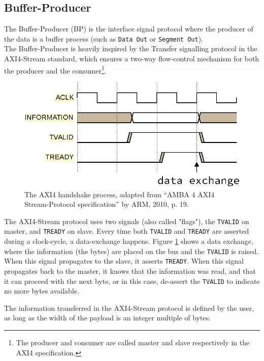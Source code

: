 \subsection{Buffer-Producer}
The Buffer-Producer (BP) is the interface signal protocol where the producer of
the data is a buffer process (such as \texttt{Data Out} or \texttt{Segment
Out}).\\
The Buffer-Producer is heavily inspired by the Transfer signalling protocol in
the AXI4-Stream standard, which ensures a two-way flow-control mechanism for both
the producer and the consumer\footnote{The producer and consumer are called
master and slave respectively in the AXI4 specification.}\cite{arm_axi4}.

\begin{figure}[h]
\centering
\includegraphics[scale=0.8]{implementation/axi4_handshake.eps}
\caption{The AXI4 handshake process, adapted from “AMBA 4 AXI4 Stream-Protocol
	specification” by ARM, 2010, p. 19.\cite{arm_axi4}}
\label{fig:axi4_handshake}
\end{figure}

The AXI4-Stream protocol uses two signals (also called "flags"), the \texttt{TVALID}
on master, and \texttt{TREADY} on slave. Every time both \texttt{TVALID} and
\texttt{TREADY} are asserted during a clock-cycle, a data-exchange happens.
Figure \ref{fig:axi4_handshake} shows a data exchange, where the information
(the bytes) are placed on the bus and the \texttt{TVALID} is raised. When this
signal propagates to the slave, it asserts \texttt{TREADY}. When this signal
propagates back to the master, it knows that the information was read, and that
it can proceed with the next byte, or in this case, de-assert the
\texttt{TVALID} to indicate no more bytes available\cite{arm_axi4}.

The information transferred in the AXI4-Stream protocol is defined by the user,
as long as the width of the payload is an integer multiple of
bytes\cite{arm_axi4}.\\

